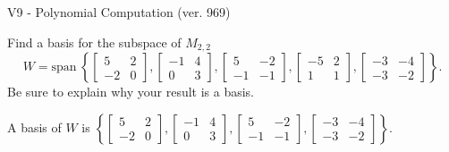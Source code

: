 \begin{exercise}
  \begin{exerciseTitle}V9 - Polynomial Computation (ver. 969)\end{exerciseTitle}
  \begin{exerciseStatement}
    Find a basis for the subspace of \(M_{2,2}\) 
\[W=\mathrm{span}\ \left\{\left[\begin{array}{cc}
5 & 2 \\
-2 & 0
\end{array}\right] , \left[\begin{array}{cc}
-1 & 4 \\
0 & 3
\end{array}\right] , \left[\begin{array}{cc}
5 & -2 \\
-1 & -1
\end{array}\right] , \left[\begin{array}{cc}
-5 & 2 \\
1 & 1
\end{array}\right] , \left[\begin{array}{cc}
-3 & -4 \\
-3 & -2
\end{array}\right]\right\}.\]
 Be sure to explain why your result is a basis.


  \end{exerciseStatement}
  \begin{exerciseAnswer}
   A basis of \(W\) is  \(\left\{\left[\begin{array}{cc}
5 & 2 \\
-2 & 0
\end{array}\right] , \left[\begin{array}{cc}
-1 & 4 \\
0 & 3
\end{array}\right] , \left[\begin{array}{cc}
5 & -2 \\
-1 & -1
\end{array}\right] , \left[\begin{array}{cc}
-3 & -4 \\
-3 & -2
\end{array}\right]\right\}\).
  


  \end{exerciseAnswer}
\end{exercise}